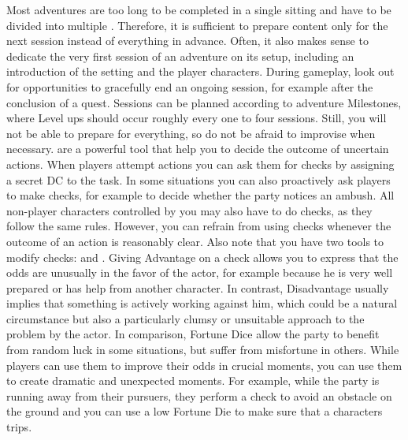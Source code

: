 %
\vfill
%
Most adventures are too long to be completed in a single sitting and have to be divided into multiple .
Therefore, it is sufficient to prepare content only for the next session instead of everything in advance.
Often, it also makes sense to dedicate the very first session of an adventure on its setup, including an introduction of the setting and the player characters.
During gameplay, look out for opportunities to gracefully end an ongoing session, for example after the conclusion of a quest.
Sessions can be planned according to adventure Milestones, where Level ups should occur roughly every one to four sessions.
Still, you will not be able to prepare for everything, so do not be afraid to improvise when necessary.
%
\newpage
%
 are a powerful tool that help you to decide the outcome of uncertain actions.
When players attempt actions you can ask them for checks by assigning a secret DC to the task.
In some situations you can also proactively ask players to make checks, for example to decide whether the party notices an ambush.
All non-player characters controlled by you may also have to do checks, as they follow the same rules.
However, you can refrain from using checks whenever the outcome of an action is reasonably clear.
%
\ofpar
%
%
\ofpar
%
Also note that you have two tools to modify checks:  and . 
Giving Advantage on a check allows you to express that the odds are unusually in the favor of the actor, for example because he is very well prepared or has help from another character. 
In contrast, Disadvantage usually implies that something is actively working against him, which could be a natural circumstance but also a particularly clumsy or unsuitable approach to the problem by the actor.
In comparison, Fortune Dice allow the party to benefit from random luck in some situations, but suffer from misfortune in others.
While players can use them to improve their odds in crucial moments, you can use them to create dramatic and unexpected moments.
For example, while the party is running away from their pursuers, they perform a check to avoid an obstacle on the ground and you can use a low Fortune Die to make sure that a characters trips. 
